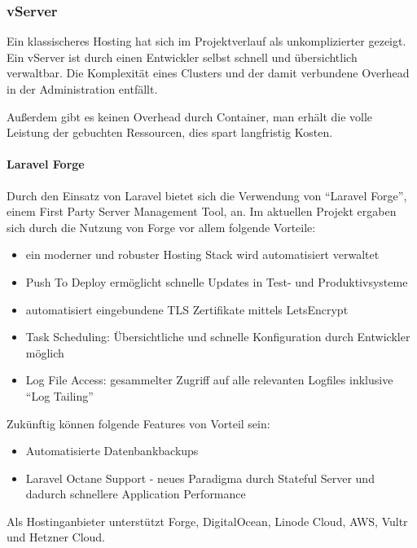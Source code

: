 \subsubsection{vServer}
Ein klassischeres Hosting hat sich im Projektverlauf als unkomplizierter gezeigt.
Ein vServer ist durch einen Entwickler selbst schnell und übersichtlich verwaltbar.
Die Komplexität eines Clusters und der damit verbundene Overhead in der Administration entfällt.

Außerdem gibt es keinen Overhead durch Container, man erhält die volle Leistung der gebuchten Ressourcen, dies spart langfristig Kosten.

\paragraph{Laravel Forge}
Durch den Einsatz von Laravel bietet sich die Verwendung von \enquote{Laravel Forge}\cite{laravel-forge}, einem First Party Server Management Tool, an.
Im aktuellen Projekt ergaben sich durch die Nutzung von Forge vor allem folgende Vorteile:
\begin{itemize}
    \item ein moderner und robuster Hosting Stack wird automatisiert verwaltet
    \item Push To Deploy ermöglicht schnelle Updates in Test- und Produktivsysteme
    \item automatisiert eingebundene TLS Zertifikate mittels LetsEncrypt
    \item Task Scheduling: Übersichtliche und schnelle Konfiguration durch Entwickler möglich
    \item Log File Access: gesammelter Zugriff auf alle relevanten Logfiles inklusive \enquote{Log Tailing}
\end{itemize}

Zukünftig können folgende Features von Vorteil sein:
\begin{itemize}
    \item Automatisierte Datenbankbackups
    \item Laravel Octane Support - neues Paradigma durch Stateful Server und dadurch schnellere Application Performance\cite{laravel-octane}
\end{itemize}

Als Hostinganbieter unterstützt Forge, DigitalOcean, Linode Cloud, AWS, Vultr und Hetzner Cloud.

